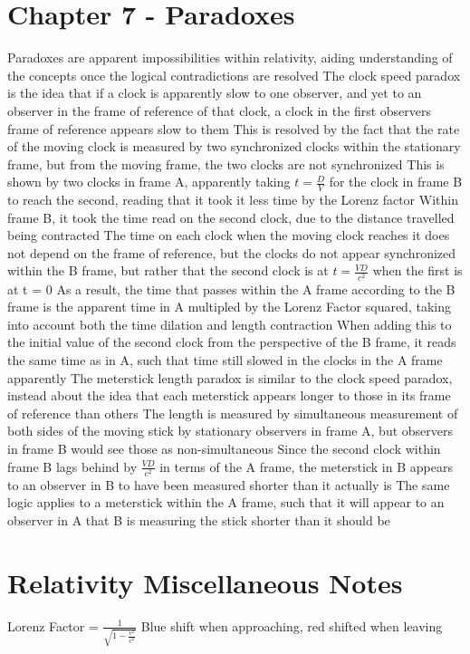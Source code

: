 \documentclass[11 pt, twoside]{article}
\newenvironment{outline*}
{
	\begin{outline}[enumerate]
	}
	{\end{outline}
}
\begin{document}
\section{Chapter 7 - Paradoxes}
\begin{outline*}
\1 Paradoxes are apparent impossibilities within relativity, aiding understanding of the concepts once the logical contradictions are resolved
\1 The clock speed paradox is the idea that if a clock is apparently slow to one observer, and yet to an observer in the frame of reference of that clock, a clock in the first observers frame of reference appears slow to them
\2 This is resolved by the fact that the rate of the moving clock is measured by two synchronized clocks within the stationary frame, but from the moving frame, the two clocks are not synchronized
\2 This is shown by two clocks in frame A, apparently taking $t = \frac{D}{V}$ for the clock in frame B to reach the second, reading that it took it less time by the Lorenz factor
\3 Within frame B, it took the time read on the second clock, due to the distance travelled being contracted
\3 The time on each clock when the moving clock reaches it does not depend on the frame of reference, but the clocks do not appear synchronized within the B frame, but rather that the second clock is at $t = \frac{VD}{c^2}$ when the first is at t = 0
\3 As a result, the time that passes within the A frame according to the B frame is the apparent time in A multipled by the Lorenz Factor squared, taking into account both the time dilation and length contraction
\4 When adding this to the initial value of the second clock from the perspective of the B frame, it reads the same time as in A, such that time still slowed in the clocks in the A frame apparently
\1 The meterstick length paradox is similar to the clock speed paradox, instead about the idea that each meterstick appears longer to those in its frame of reference than others
\2 The length is measured by simultaneous measurement of both sides of the moving stick by stationary observers in frame A, but observers in frame B would see those as non-simultaneous
\2 Since the second clock within frame B lags behind by $\frac{VD}{c^2}$ in terms of the A frame, the meterstick in B appears to an observer in B to have been measured shorter than it actually is
\3 The same logic applies to a meterstick within the A frame, such that it will appear to an observer in A that B is measuring the stick shorter than it should be
\end{outline*}
\section{Relativity Miscellaneous Notes}
Lorenz Factor = $\frac{1}{\sqrt{1 - \frac{v^2}{c^2}}}$
Blue shift when approaching, red shifted when leaving
\end{document}
